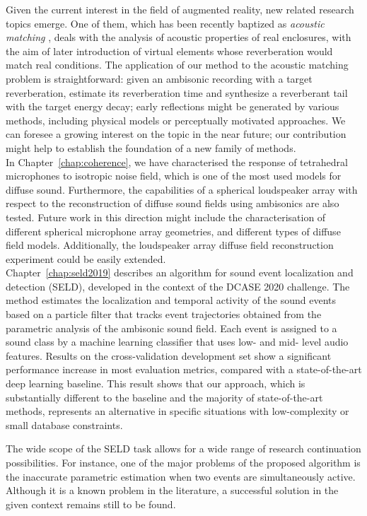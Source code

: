 Given the current interest in the field of augmented reality, new related research topics emerge. One of them, which has been recently baptized as \textit{acoustic matching} \cite{su2020acoustic}, deals with the analysis of acoustic properties of real enclosures, with the aim of later introduction of virtual elements whose reverberation would match real conditions. 
The application of our method to the acoustic matching problem is straightforward: given an ambisonic recording with a target reverberation, estimate its reverberation time and synthesize a reverberant tail with the target energy decay; early reflections might be generated by various methods, including physical models or perceptually motivated approaches. 
We can foresee a growing interest on the topic in the near future; our contribution might help to establish the foundation of a new family of methods. \\


In Chapter~\ref{chap:coherence}, we have characterised the response of tetrahedral microphones to isotropic noise field, which is one of the most used models for diffuse sound. Furthermore, the capabilities of a spherical loudspeaker array with respect to the reconstruction of diffuse sound fields using ambisonics are also tested. 
Future work in this direction might include the characterisation of different spherical microphone array geometries, and different types of diffuse field models. Additionally, the loudspeaker array diffuse field reconstruction experiment could be easily extended. \\


Chapter~\ref{chap:seld2019} describes an algorithm for sound event localization and detection (SELD), developed in the context of the DCASE 2020 challenge. The method estimates the localization and temporal activity of the sound events based on a particle filter that tracks event trajectories obtained from the parametric analysis of the ambisonic sound field. Each event is assigned to a sound class by a machine learning classifier that uses low- and mid- level audio features. Results on the cross-validation development set show a significant performance increase in most evaluation metrics, compared with a state-of-the-art deep learning baseline. This result shows that our approach, which is substantially different to the baseline and the majority of state-of-the-art methods, represents an alternative in specific situations with low-complexity or small database constraints. 

The wide scope of the SELD task allows for a wide range of research continuation possibilities. For instance, one of the major problems of the proposed algorithm is the inaccurate parametric estimation when two events are simultaneously active. Although it is a known problem in the literature, a successful solution in the given context remains still to be found.

